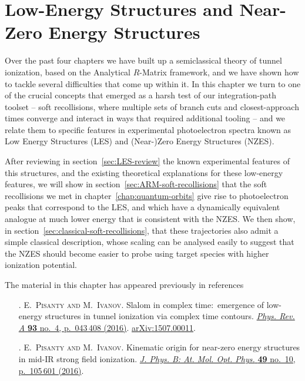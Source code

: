 \chapter{Low-Energy Structures and Near-Zero Energy Structures}
\label{chap:LES-NZES}

Over the past four chapters we have built up a semiclassical theory of tunnel ionization, based on the Analytical $R$-Matrix framework, and we have shown how to tackle several difficulties that come up within it. In this chapter we turn to one of the crucial concepts that emerged as a harsh test of our integration-path toolset -- soft recollisions, where multiple sets of branch cuts and closest-approach times converge and interact in ways that required additional tooling -- and we relate them to specific features in experimental photoelectron spectra known as Low Energy Structures (LES) and (Near-)Zero Energy Structures (NZES).

After reviewing in section~\ref{sec:LES-review} the known experimental features of this structures, and the existing theoretical explanations for these low-energy features, we will show in section~\ref{sec:ARM-soft-recollisions} that the soft recollisions we met in chapter~\ref{chap:quantum-orbits} give rise to photoelectron peaks that correspond to the LES, and which have a dynamically equivalent analogue at much lower energy that is consistent with the NZES. We then show, in section~\ref{sec:classical-soft-recollisions}, that these trajectories also admit a simple classical description, whose scaling can be analysed easily to suggest that the NZES should become easier to probe using target species with higher ionization potential.

The material in this chapter has appeared previously in references
\begin{enumerate}
\item[{\hypersetup{citecolor=black}\citealp{Pisanty_slalom_2016}}.]
\textsc{E.~Pisanty and M.~Ivanov}.
\newblock Slalom in complex time:\ emergence of low-energy structures in tunnel
  ionization via complex time contours.
\newblock \href{http://dx.doi.org/10.1103/PhysRevA.93.043408}{
          \emph{Phys. Rev. A} \textbf{93} no.~4, p.~043\,408 (2016)}.
\newblock \href{http://arxiv.org/abs/1507.00011}{{arXiv}:1507.00011}.

\item[{\hypersetup{citecolor=black}\citealp{Pisanty_kinematic_2016}}.]
\textsc{E.~Pisanty and M.~Ivanov}.
\newblock Kinematic origin for near-zero energy structures in mid-{IR} strong field ionization.
\newblock \href{http://dx.doi.org/10.1088/0953-4075/49/10/105601}{
          \emph{J. Phys. B: At. Mol. Opt. Phys.} \textbf{49} no.~10, p.~105\,601 (2016)}.
\end{enumerate}







